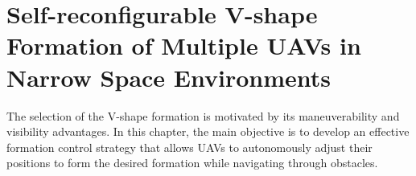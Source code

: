 \chapter{Self-reconfigurable V-shape Formation of Multiple UAVs in Narrow Space Environments}\label{paper1}

\vspace{1cm}



The selection of the V-shape formation is motivated by its maneuverability and visibility advantages. In this chapter, the main objective is to develop an effective formation control strategy that allows UAVs to autonomously adjust their positions to form the desired formation while navigating through obstacles.








